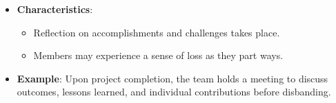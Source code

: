 \documentclass[aspectratio=169]{beamer}
\begin{document}
\begin{frame}[fragile]
\begin{enumerate}
\begin{itemize}
                \item \textbf{Characteristics}:
                    \begin{itemize}
                        \item Reflection on accomplishments and challenges takes place.
                        \item Members may experience a sense of loss as they part ways.
                    \end{itemize}
                \item \textbf{Example}: Upon project completion, the team holds a meeting to discuss outcomes, lessons learned, and individual contributions before disbanding.
            \end{itemize}
    \end{enumerate}
\end{frame}
\end{document}
